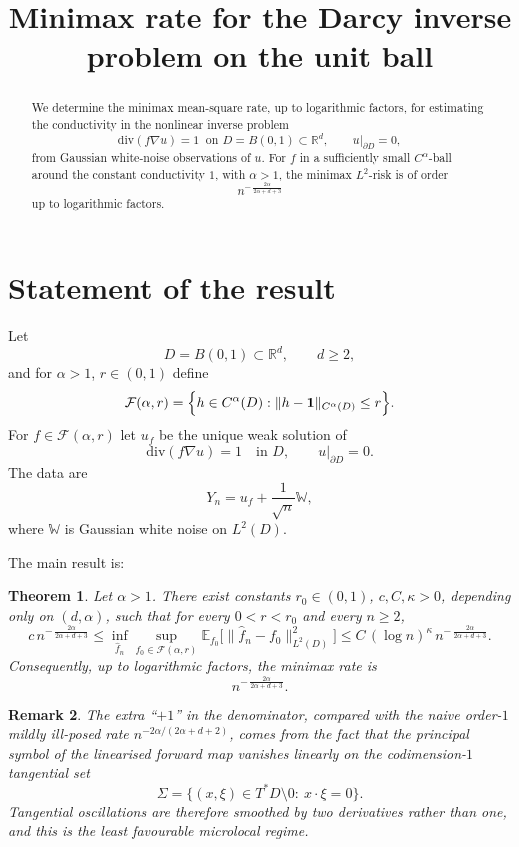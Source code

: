\documentclass[11pt]{article}
\newtheorem{theorem}{Theorem}
\newtheorem{remark}[theorem]{Remark}
\newcommand{\R}{\mathbb R}
\newcommand{\E}{\mathbb E}
\newcommand{\one}{\mathbf 1}
\newcommand{\diver}{\mathrm{div}}
\begin{document}
\title{Minimax rate for the Darcy inverse problem on the unit ball}
\author{}
\date{}
\maketitle

\begin{abstract}
We determine the minimax mean-square rate, up to logarithmic factors, for estimating the conductivity in the nonlinear inverse problem
\[
\diver(f\nabla u)=1 \ \text{ on } D=B(0,1)\subset \R^d,\qquad u|_{\partial D}=0,
\]
from Gaussian white-noise observations of $u$.  For $f$ in a sufficiently small $C^\alpha$-ball around the constant conductivity $1$, with $\alpha>1$, the minimax $L^2$-risk is of order
\[
n^{-\,\frac{2\alpha}{2\alpha+d+3}}
\]
up to logarithmic factors.
\end{abstract}

\section{Statement of the result}

Let
\[
D=B(0,1)\subset \R^d,\qquad d\ge 2,
\]
and for $\alpha>1$, $r\in(0,1)$ define
\[
\mathcal F(\alpha,r)=\Bigl\{h\in C^\alpha(D): \|h-\one\|_{C^\alpha(D)}\le r\Bigr\}.
\]
For $f\in \mathcal F(\alpha,r)$ let $u_f$ be the unique weak solution of
\[
\diver(f\nabla u)=1\quad\text{in }D,\qquad u|_{\partial D}=0.
\]
The data are
\[
Y_n=u_f+\frac1{\sqrt n}\mathbb W,
\]
where $\mathbb W$ is Gaussian white noise on $L^2(D)$.

The main result is:

\begin{theorem}\label{thm:main}
Let $\alpha>1$. There exist constants $r_0\in(0,1)$, $c,C,\kappa>0$, depending only on $(d,\alpha)$, such that for every $0<r<r_0$ and every $n\ge 2$,
\[
c\, n^{-\,\frac{2\alpha}{2\alpha+d+3}}
\le
\inf_{\hat f_n}\sup_{f_0\in \mathcal F(\alpha,r)}
\E_{f_0}\bigl[\|\hat f_n-f_0\|_{L^2(D)}^2\bigr]
\le
C\,(\log n)^\kappa\, n^{-\,\frac{2\alpha}{2\alpha+d+3}}.
\]
Consequently, up to logarithmic factors, the minimax rate is
\[
n^{-\,\frac{2\alpha}{2\alpha+d+3}}.
\]
\end{theorem}

\begin{remark}
The extra ``$+1$'' in the denominator, compared with the naive order-$1$ mildly ill-posed rate
$ n^{-2\alpha/(2\alpha+d+2)}$,
comes from the fact that the principal symbol of the linearised forward map vanishes \emph{linearly} on the codimension-$1$ tangential set
\[
\Sigma=\{(x,\xi)\in T^*D\setminus 0:\ x\cdot \xi=0\}.
\]
Tangential oscillations are therefore smoothed by two derivatives rather than one, and this is the least favourable microlocal regime.
\end{remark}
\end{document}
